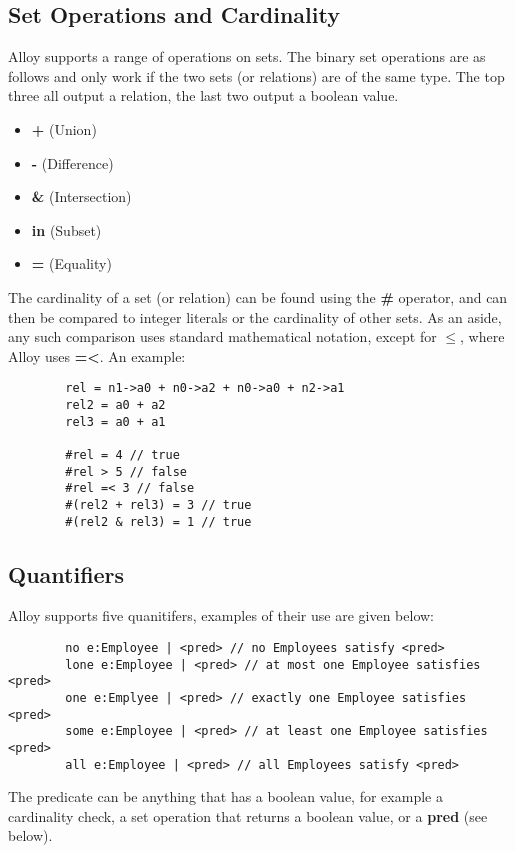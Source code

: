 \documentclass[10pt]{article}
\begin{document}
    \subsection*{Set Operations and Cardinality}
      Alloy supports a range of operations on sets. The binary set operations are as follows and only work if the two sets (or relations) are of the same type. The top three all output a relation, the last two output a boolean value.
      \begin{itemize}
        \item\textbf{+} (Union)
        \item\textbf{-} (Difference)
        \item\textbf{\&} (Intersection)
        \item\textbf{in} (Subset)
        \item\textbf{=} (Equality)
      \end{itemize}\par
      The cardinality of a set (or relation) can be found using the \textbf{\#} operator, and can then be compared to integer literals or the cardinality of other sets. As an aside, any such comparison uses standard mathematical notation, except for $\leq$, where Alloy uses \textbf{=\textless}. An example:
      \begin{verbatim}
        rel = n1->a0 + n0->a2 + n0->a0 + n2->a1
        rel2 = a0 + a2
        rel3 = a0 + a1

        #rel = 4 // true
        #rel > 5 // false
        #rel =< 3 // false
        #(rel2 + rel3) = 3 // true
        #(rel2 & rel3) = 1 // true
      \end{verbatim}
    \subsection*{Quantifiers}
      Alloy supports five quanitifers, examples of their use are given below:
      \begin{verbatim}
        no e:Employee | <pred> // no Employees satisfy <pred>
        lone e:Employee | <pred> // at most one Employee satisfies <pred>
        one e:Emplyee | <pred> // exactly one Employee satisfies <pred>
        some e:Employee | <pred> // at least one Employee satisfies <pred>
        all e:Employee | <pred> // all Employees satisfy <pred>
      \end{verbatim}
      The predicate can be anything that has a boolean value, for example a cardinality check, a set operation that returns a boolean value, or a \textbf{pred} (see below).
\end{document}
